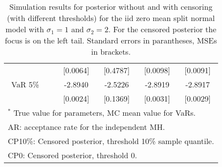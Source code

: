 {\begin{table}
\begin{tabular}{cc cccc}
  && [0.0064] & [0.4787] & [0.0098] & [0.0091]  \\ 
VaR 5\% && -2.8940 & -2.5226 & -2.8919 & -2.8917  \\ 
 && [0.0024] & [0.1369] & [0.0031] & [0.0029]  \\ 
\hline 
\multicolumn{6}{l}{\footnotesize{$^*$ True value for parameters, MC mean value for VaRs.}}  \\ 
\multicolumn{6}{l}{\footnotesize{AR: acceptance rate for the independent MH.}}  \\ 
\multicolumn{6}{l}{\footnotesize{CP10\%: Censored posterior, threshold 10\% sample quantile.}}  \\ 
\multicolumn{6}{l}{\footnotesize{CP0: Censored posterior, threshold 0.}} 
\end{tabular}
 \caption{Simulation results for posterior without and with censoring (with different thresholds) for the iid zero mean split normal model with $\sigma_{1} = 1$ and $\sigma_{2} = 2$. For the censored posterior the focus is on the left tail. Standard errors in parantheses, MSEs in brackets.} 
\label{tab:iid}  
\end{table}
}